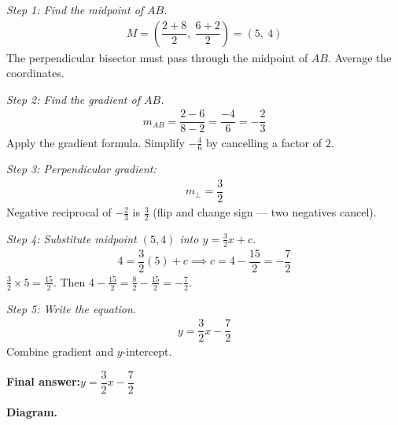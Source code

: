 \documentclass[11pt]{article}
\begin{document}
\textit{Step 1: Find the midpoint of \( AB \).}
\[\begin{gathered}
M = \left(\dfrac{2+8}{2},\ \dfrac{6+2}{2}\right) = (5,\ 4)
\end{gathered}\]
The perpendicular bisector must pass through the midpoint of \( AB \). Average the coordinates.

\textit{Step 2: Find the gradient of \( AB \).}
\[\begin{gathered}
m_{AB} = \dfrac{2 - 6}{8 - 2} = \dfrac{-4}{6} = -\dfrac{2}{3}
\end{gathered}\]
Apply the gradient formula. Simplify \( -\tfrac{4}{6} \) by cancelling a factor of \( 2 \).

\textit{Step 3: Perpendicular gradient:}
\[\begin{gathered}
m_\perp = \dfrac{3}{2}
\end{gathered}\]
Negative reciprocal of \( -\tfrac{2}{3} \) is \( \tfrac{3}{2} \) (flip and change sign --- two negatives cancel).

\textit{Step 4: Substitute midpoint \( (5, 4) \) into \( y = \frac{3}{2}x + c \).}
\[\begin{gathered}
4 = \dfrac{3}{2}(5) + c \implies c = 4 - \dfrac{15}{2} = -\dfrac{7}{2}
\end{gathered}\]
\( \tfrac{3}{2} \times 5 = \tfrac{15}{2} \). Then \( 4 - \tfrac{15}{2} = \tfrac{8}{2} - \tfrac{15}{2} = -\tfrac{7}{2} \).

\textit{Step 5: Write the equation.}
\[\begin{gathered}
y = \dfrac{3}{2}x - \dfrac{7}{2}
\end{gathered}\]
Combine gradient and \( y \)-intercept.

\begin{answerbox}
\textbf{Final answer:}\quad \(\displaystyle y = \dfrac{3}{2}x - \dfrac{7}{2}\)
\end{answerbox}
\textbf{Diagram.}
\end{document}
